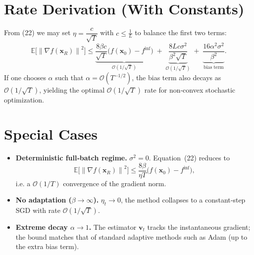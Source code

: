 \documentclass{article}
\newcommand{\E}{\mathbb{E}}
\newcommand{\norm}[1]{\left\|#1\right\|}
\newcommand{\grad}{\nabla}
\begin{document}
\section*{Rate Derivation (With Constants)}
From (22) we may set $\eta = \dfrac{c}{\sqrt{T}}$ with $c\le \frac{1}{L}$ to balance the first two terms:
\[
\E\!\bigl[\norm{\grad f(\mathbf{x}_{R})}^{2}\bigr]
\le
\underbrace{\frac{8\beta c}{\sqrt{T}}\bigl(f(\mathbf{x}_0)-f^{\inf}\bigr)}_{\mathcal{O}(1/\sqrt{T})}
\;+\;
\underbrace{\frac{8Lc\sigma^{2}}{\beta^{2}\sqrt{T}}}_{\mathcal{O}(1/\sqrt{T})}
\;+\;
\underbrace{\frac{16\alpha^{2}\sigma^{2}}{\beta^{2}}}_{\text{bias term}} .
\]
If one chooses $\alpha$ such that $\alpha= \mathcal{O}(T^{-1/2})$, the bias term also decays as $\mathcal{O}(1/\sqrt{T})$, yielding the optimal $\mathcal{O}(1/\sqrt{T})$ rate for non‑convex stochastic optimization.

\section*{Special Cases}
\begin{itemize}[leftmargin=*]
\item \textbf{Deterministic full‑batch regime.} $\sigma^{2}=0$. Equation~(22) reduces to 
\[
\E\!\bigl[\norm{\grad f(\mathbf{x}_{R})}^{2}\bigr]
\le \frac{8\beta}{\eta T}\bigl(f(\mathbf{x}_0)-f^{\inf}\bigr),
\]
i.e. a $\mathcal{O}(1/T)$ convergence of the gradient norm.
\item \textbf{No adaptation ($\beta\to\infty$).} $\eta_t\to 0$, the method collapses to a constant‑step SGD with rate $\mathcal{O}(1/\sqrt{T})$.
\item \textbf{Extreme decay $\alpha\to 1$.} The estimator $\mathbf{v}_t$ tracks the instantaneous gradient; the bound matches that of standard adaptive methods such as Adam (up to the extra bias term).
\end{itemize}
\end{document}
